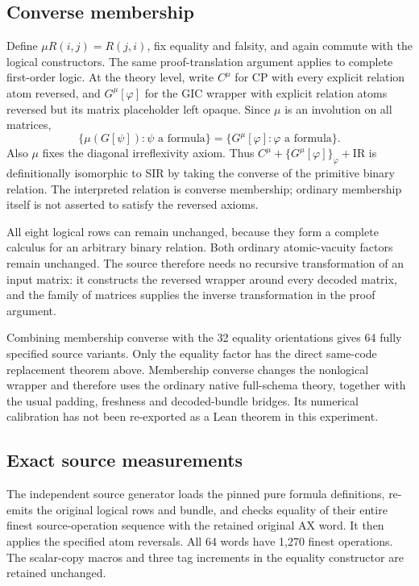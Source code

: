 \subsection{Converse membership}

Define $\mu R(i,j)=R(j,i)$, fix equality and falsity, and again
commute with the logical constructors.  The same proof-translation
argument applies to complete first-order logic.  At the theory level,
write $C^\mu$ for CP with every explicit relation atom reversed, and
$G^\mu[\varphi]$ for the GIC wrapper with explicit relation atoms
reversed but its matrix placeholder left opaque.  Since $\mu$ is an
involution on all matrices,
\[
 \{\mu(G[\psi]):\psi\text{ a formula}\}
       =\{G^\mu[\varphi]:\varphi\text{ a formula}\}.
\]
Also $\mu$ fixes the diagonal irreflexivity axiom.  Thus
$C^\mu+\{G^\mu[\varphi]\}_\varphi+\mathrm{IR}$ is
definitionally isomorphic to SIR by taking the converse of the
primitive binary relation.  The interpreted relation is converse
membership; ordinary membership itself is not asserted to satisfy
the reversed axioms.

All eight logical rows can remain unchanged, because they form a
complete calculus for an arbitrary binary relation.  Both ordinary
atomic-vacuity factors remain unchanged.  The source therefore
needs no recursive transformation of an input matrix: it constructs
the reversed wrapper around every decoded matrix, and the family of
matrices supplies the inverse transformation in the proof argument.

Combining membership converse with the 32 equality orientations
gives 64 fully specified source variants.  Only the equality
factor has the direct same-code replacement theorem above.
Membership converse changes the nonlogical wrapper and therefore
uses the ordinary native full-schema theory, together with the
usual padding, freshness and decoded-bundle bridges.  Its
numerical calibration has not been re-exported as a Lean theorem
in this experiment.

\subsection{Exact source measurements}

The independent source generator loads the pinned pure formula
definitions, re-emits the original logical rows and bundle, and
checks equality of their entire finest source-operation sequence
with the retained original AX word.  It then applies the specified
atom reversals.  All 64 words have 1,270 finest operations.  The
scalar-copy macros and three tag increments in the equality
constructor are retained unchanged.


